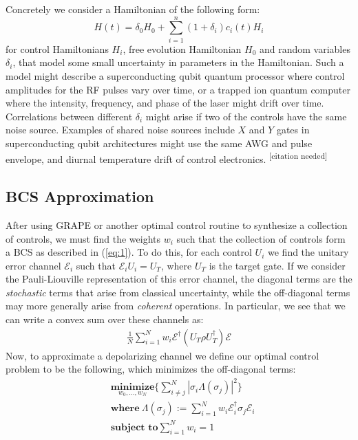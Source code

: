 \documentclass[aps,nofootinbib,pra,notitlepage,twocolumn]{revtex4-1}
\newcommand{\needcite}{{\color{blue}\textsuperscript{[citation needed]}}}
\begin{document}
Concretely we consider a Hamiltonian of the following form:
\begin{equation}\label{eq:2}
  H(t) = \delta_0H_0 + \sum_{i=1}^n (1 + \delta_i)c_i(t)H_i
\end{equation}
for control Hamiltonians $H_i$, free evolution Hamiltonian $H_0$ and random variables $\delta_i$, that model some small uncertainty in parameters in the Hamiltonian. Such a model might describe a superconducting qubit quantum processor where control amplitudes for the RF pulses vary over time, or a trapped ion quantum computer where the intensity, frequency, and phase of the laser might drift over time.\cite{Lekitsch2017} Correlations between different $\delta_i$ might arise if two of the controls have the same noise source. Examples of shared noise sources include $X$ and $Y$ gates in superconducting qubit architectures might use the same AWG and pulse envelope, and diurnal temperature drift of control electronics. \needcite



\subsection{BCS Approximation}
After using GRAPE or another optimal control routine to synthesize a collection of controls, we must find the weights $w_i$ such that the collection of controls form a BCS as described in (\ref{eq:1}). To do this, for each control $U_i$ we find the unitary error channel $\mathcal{E}_i$ such that $\mathcal{E}_iU_i=U_T$, where $U_T$ is the target gate. If we consider the Pauli-Liouville representation\cite{Kimmel2014} of this error channel, the diagonal terms are the \textit{stochastic} terms that arise from classical uncertainty, while the off-diagonal terms may more generally arise from \textit{coherent} operations. In particular, we see that we can write a convex sum over these channels as:
\begin{align}
 \frac{1}{N} \sum^N_{i=1} w_i \mathcal{E}^{\dagger} (U_T\rho U_T^{\dagger}) \mathcal{E}
\end{align}
Now, to approximate a depolarizing channel we define our optimal control problem to be the following, which minimizes the off-diagonal terms:
\begin{equation}\label{eq:minimization}
  \begin{split}
    &\underset{w_0, ..., w_N}{\textbf{minimize}} \{\sum_{i\neq j}^N|\sigma_i\Lambda(\sigma_j)|^2\}\\
    &\textbf{where}\ \Lambda(\sigma_j) := \sum^N_{i=1}w_i\mathcal{E}_i^{\dagger}\sigma_j\mathcal{E}_i\\
    &\textbf{subject to} \sum_{i=1}^Nw_i = 1
  \end{split}
\end{equation}
\end{document}
